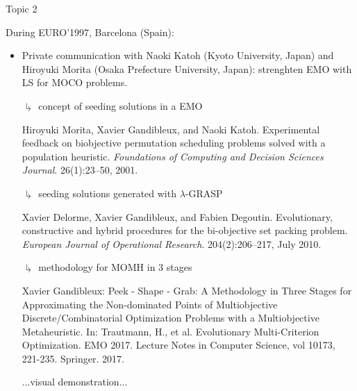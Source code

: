 \documentclass[10pt,xcolor=dvipsnames]{beamer}
\begin{document}
\begin{frame}{Topic 2}

During EURO'1997, Barcelona (Spain):

\begin{itemize}

\item Private communication with Naoki Katoh (Kyoto University, Japan) and Hiroyuki Morita (Osaka Prefecture University, Japan): 
\color{blue}strenghten EMO with LS for MOCO problems.\color{black}
\vspace{3mm}

$\drsh$ concept of seeding solutions in a EMO


{\tiny Hiroyuki Morita, Xavier Gandibleux, and Naoki Katoh. 
Experimental feedback on biobjective permutation scheduling problems solved with a population heuristic. 
\textit{Foundations of Computing and Decision Sciences Journal}. 26(1):23–50, 2001.

}
\vspace{3mm}

$\drsh$ seeding solutions generated with $\lambda$-GRASP


{\tiny Xavier Delorme, Xavier Gandibleux, and Fabien Degoutin. 
Evolutionary, constructive and hybrid procedures for the bi-objective set packing problem. 
\textit{European Journal of Operational Research}. 204(2):206–217, July 2010.

}
\vspace{3mm}

$\drsh$ methodology for MOMH  in 3 stages


{\tiny Xavier Gandibleux:
Peek - Shape - Grab: A Methodology in Three Stages for Approximating the Non-dominated Points of Multiobjective Discrete/Combinatorial Optimization Problems with a Multiobjective Metaheuristic. In: Trautmann, H., et al. Evolutionary Multi-Criterion Optimization. EMO 2017. Lecture Notes in Computer Science, vol 10173, 221-235. Springer. 2017.

}
\vspace{3mm}

\hfill ...visual demonstration...

\end{itemize}

\end{frame}
\end{document}
